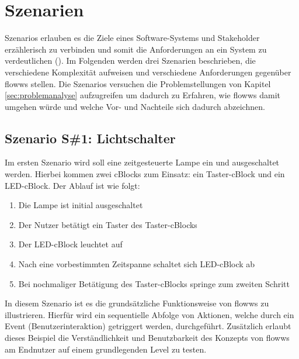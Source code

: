 \section{Szenarien}\label{sec:szenarien}
Szenarios erlauben es die Ziele eines Software-Systems und Stakeholder erzählerisch zu verbinden und somit die Anforderungen an ein System zu verdeutlichen (\cite{Lamsweerde2001scenario}). Im Folgenden werden drei Szenarien beschrieben, die verschiedene Komplexität aufweisen und verschiedene Anforderungen gegenüber flowws stellen. Die Szenarios versuchen die Problemstellungen von Kapitel \ref{sec:problemanalyse} aufzugreifen um dadurch zu Erfahren, wie flowws damit umgehen würde und welche Vor- und Nachteile sich dadurch abzeichnen. 

\subsection{Szenario S\#1: Lichtschalter\label{szenario1}}
Im ersten Szenario wird soll eine zeitgesteuerte Lampe ein und ausgeschaltet werden. Hierbei kommen zwei cBlocks zum Einsatz: ein Taster-cBlock und ein LED-cBlock. Der Ablauf ist wie folgt:
\begin{enumerate}
    \item Die Lampe ist initial ausgeschaltet
    \item Der Nutzer betätigt ein Taster des Taster-cBlocks
    \item Der LED-cBlock leuchtet auf
    \item Nach eine vorbestimmten Zeitspanne schaltet sich LED-cBlock ab
    \item Bei nochmaliger Betätigung des Taster-cBlocks springe zum zweiten Schritt
\end{enumerate}
In diesem Szenario ist es die grundsätzliche Funktionsweise von flowws zu illustrieren. Hierfür wird ein sequentielle Abfolge von Aktionen, welche durch ein Event (Benutzerinteraktion) getriggert werden, durchgeführt. Zusätzlich erlaubt dieses Beispiel die Verständlichkeit und Benutzbarkeit des Konzepts von flowws am Endnutzer auf einem grundlegenden Level zu testen.

